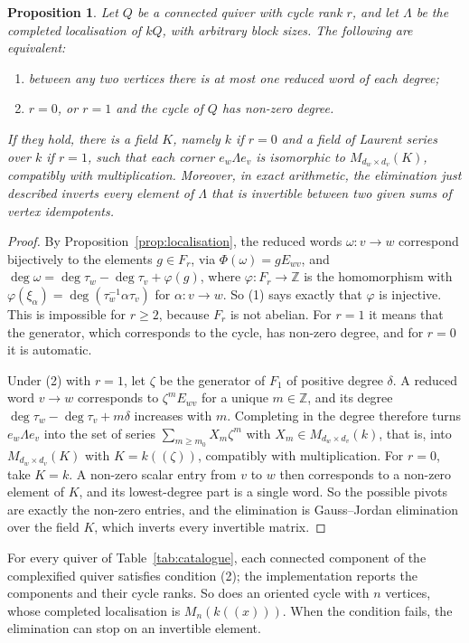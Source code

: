 \documentclass[12pt, a4paper]{report}
\theoremstyle{plain}
\newtheorem{proposition}[theorem]{Proposition}
\theoremstyle{definition}
\theoremstyle{remark}
\theoremstyle{plain}
\newcommand{\ZZ}{\mathbb{Z}}
\begin{document}
\begin{proposition}\label{prop:lambda-complete}
Let $Q$ be a connected quiver with cycle rank $r$, and let $\Lambda$ be the completed localisation of $kQ$, with arbitrary block sizes. The following are equivalent:
\begin{enumerate}
  \item between any two vertices there is at most one reduced word of each degree;
  \item $r=0$, or $r=1$ and the cycle of $Q$ has non-zero degree.
\end{enumerate}
If they hold, there is a field $K$, namely $k$ if $r=0$ and a field of Laurent series over $k$ if $r=1$, such that each corner $e_w\Lambda e_v$ is isomorphic to $M_{d_w\times d_v}(K)$, compatibly with multiplication. Moreover, in exact arithmetic, the elimination just described inverts every element of $\Lambda$ that is invertible between two given sums of vertex idempotents.
\end{proposition}
\begin{proof}
By Proposition~\ref{prop:localisation}, the reduced words $\omega:v\to w$ correspond bijectively to the elements $g\in F_r$, via $\Phi(\omega)=gE_{wv}$, and $\deg\omega=\deg\tau_w-\deg\tau_v+\varphi(g)$, where $\varphi:F_r\to\ZZ$ is the homomorphism with $\varphi(\xi_\alpha)=\deg(\tau_w^{-1}\alpha\tau_v)$ for $\alpha:v\to w$. So (1) says exactly that $\varphi$ is injective. This is impossible for $r\geq2$, because $F_r$ is not abelian. For $r=1$ it means that the generator, which corresponds to the cycle, has non-zero degree, and for $r=0$ it is automatic.

Under (2) with $r=1$, let $\zeta$ be the generator of $F_1$ of positive degree $\delta$. A reduced word $v\to w$ corresponds to $\zeta^mE_{wv}$ for a unique $m\in\ZZ$, and its degree $\deg\tau_w-\deg\tau_v+m\delta$ increases with $m$. Completing in the degree therefore turns $e_w\Lambda e_v$ into the set of series $\sum_{m\geq m_0}X_m\zeta^m$ with $X_m\in M_{d_w\times d_v}(k)$, that is, into $M_{d_w\times d_v}(K)$ with $K=k((\zeta))$, compatibly with multiplication. For $r=0$, take $K=k$. A non-zero scalar entry from $v$ to $w$ then corresponds to a non-zero element of $K$, and its lowest-degree part is a single word. So the possible pivots are exactly the non-zero entries, and the elimination is Gauss--Jordan elimination over the field $K$, which inverts every invertible matrix.
\end{proof}

For every quiver of Table~\ref{tab:catalogue}, each connected component of the complexified quiver satisfies condition (2); the implementation reports the components and their cycle ranks. So does an oriented cycle with $n$ vertices, whose completed localisation is $M_n(k((x)))$. When the condition fails, the elimination can stop on an invertible element.
\end{document}
